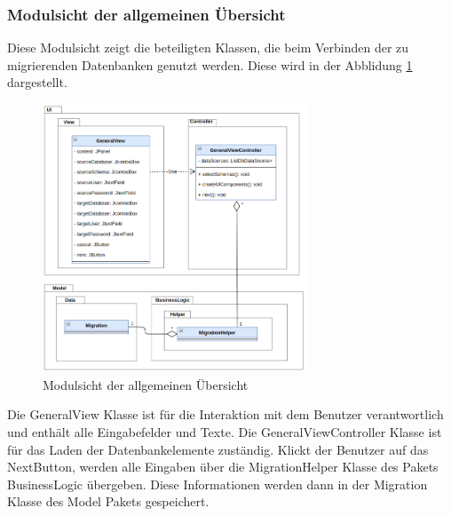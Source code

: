 	\subsubsection{Modulsicht der allgemeinen Übersicht}
	Diese Modulsicht zeigt die beteiligten Klassen, die beim Verbinden der zu migrierenden Datenbanken genutzt werden. Diese wird in der Abblidung \ref{img:modulsicht-general} dargestellt. 
	\begin{figure}[H]
		\centering
		\includegraphics[width=0.7\textwidth]{images/sichten/modulsicht-general}
		\caption{Modulsicht der allgemeinen Übersicht}
		\label{img:modulsicht-general}
	\end{figure}
	Die GeneralView Klasse ist für die Interaktion mit dem Benutzer verantwortlich und enthält alle Eingabefelder und Texte. Die GeneralViewController Klasse ist für das Laden der Datenbankelemente zuständig. Klickt der Benutzer auf das \glq Next\grqq Button, werden alle Eingaben über die MigrationHelper Klasse des Pakets BusinessLogic übergeben. Diese Informationen werden dann in der Migration Klasse des Model Pakets gespeichert.
	
	
